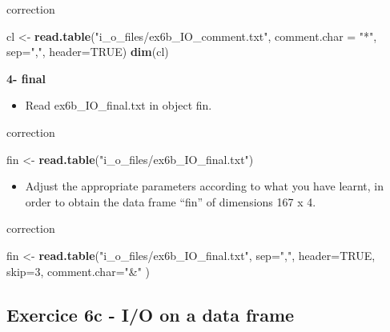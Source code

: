 \documentclass[]{book}
\newenvironment{Shaded}{\begin{snugshade}}{\end{snugshade}}
\newcommand{\DataTypeTok}[1]{\textcolor[rgb]{0.13,0.29,0.53}{#1}}
\newcommand{\DecValTok}[1]{\textcolor[rgb]{0.00,0.00,0.81}{#1}}
\newcommand{\KeywordTok}[1]{\textcolor[rgb]{0.13,0.29,0.53}{\textbf{#1}}}
\newcommand{\NormalTok}[1]{#1}
\newcommand{\OtherTok}[1]{\textcolor[rgb]{0.56,0.35,0.01}{#1}}
\newcommand{\StringTok}[1]{\textcolor[rgb]{0.31,0.60,0.02}{#1}}
\providecommand{\tightlist}{%
  \setlength{\itemsep}{0pt}\setlength{\parskip}{0pt}}
\begin{document}
correction

\begin{Shaded}
\begin{Highlighting}[]
\NormalTok{cl <-}\StringTok{ }\KeywordTok{read.table}\NormalTok{(}\StringTok{"i_o_files/ex6b_IO_comment.txt"}\NormalTok{,}
                 \DataTypeTok{comment.char =} \StringTok{"*"}\NormalTok{,}
                 \DataTypeTok{sep=}\StringTok{","}\NormalTok{,}
                 \DataTypeTok{header=}\OtherTok{TRUE}\NormalTok{)}
\KeywordTok{dim}\NormalTok{(cl)}
\end{Highlighting}
\end{Shaded}

\textbf{4- final}

\begin{itemize}
\tightlist
\item
  Read ex6b\_IO\_final.txt in object fin.
\end{itemize}

correction

\begin{Shaded}
\begin{Highlighting}[]
\NormalTok{fin <-}\StringTok{ }\KeywordTok{read.table}\NormalTok{(}\StringTok{"i_o_files/ex6b_IO_final.txt"}\NormalTok{)}
\end{Highlighting}
\end{Shaded}

\begin{itemize}
\tightlist
\item
  Adjust the appropriate parameters according to what you have learnt, in order to obtain the data frame ``fin'' of dimensions 167 x 4.
\end{itemize}

correction

\begin{Shaded}
\begin{Highlighting}[]
\NormalTok{fin <-}\StringTok{ }\KeywordTok{read.table}\NormalTok{(}\StringTok{"i_o_files/ex6b_IO_final.txt"}\NormalTok{,}
                  \DataTypeTok{sep=}\StringTok{","}\NormalTok{,}
                  \DataTypeTok{header=}\OtherTok{TRUE}\NormalTok{,}
                  \DataTypeTok{skip=}\DecValTok{3}\NormalTok{,}
                  \DataTypeTok{comment.char=}\StringTok{"&"}
\NormalTok{                  )}
\end{Highlighting}
\end{Shaded}

\hypertarget{exercice-6c---io-on-a-data-frame}{%
\subsection{Exercice 6c - I/O on a data frame}\label{exercice-6c---io-on-a-data-frame}}
\end{document}
